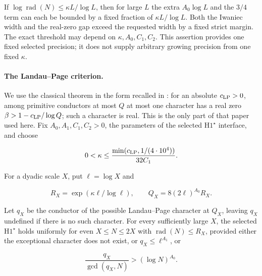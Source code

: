 \documentclass[11pt]{article}
\theoremstyle{definition}
\theoremstyle{remark}
\numberwithin{equation}{section}
\begin{document}
If $\log\operatorname{rad}(N)\le\kappa L/\log L$, then for large $L$ the extra $A_0\log L$ and the $3/4$ term can each be bounded by a fixed fraction of $\kappa L/\log L$. Both the Iwaniec width and the real-zero gap exceed the requested width by a fixed strict margin. The exact threshold may depend on $\kappa,A_0,C_1,C_2$. This assertion provides one fixed selected precision; it does not supply arbitrary growing precision from one fixed $\kappa$.

\paragraph{The Landau--Page criterion.}
We use the classical theorem in the form recalled in
\cite[Lemma~7.1]{FGKMT}: for an absolute $c_{\rm LP}>0$,
among primitive conductors at most $Q$ at most one character
has a real zero $\beta>1-c_{\rm LP}/\log Q$; such a character
is real. This is the only part of that paper used here.
Fix $A_0,A_1,C_1,C_2>0$, the parameters of the selected $\mathrm H1^\star$ interface, and choose


\begin{equation}
0<\kappa\le\frac{\min(c_{\rm LP},1/(4\cdot10^4))}{32C_1}.
\end{equation}


For a dyadic scale $X$, put $\ell=\log X$ and


\begin{equation}
R_X=\exp(\kappa\ell/\log\ell),\qquad Q_X=8(2\ell)^{A_0}R_X.
\end{equation}


Let $q_X$ be the conductor of the possible Landau--Page character at $Q_X$, leaving $q_X$ undefined if there is no such character. For every sufficiently large $X$, the selected $\mathrm H1^\star$ holds uniformly for even $X\le N\le2X$ with $\operatorname{rad}(N)\le R_X$, provided either the exceptional character does not exist, or $q_X\le\ell^{A_1}$, or


\begin{equation}\label{v2:12-3}
\frac{q_X}{\gcd(q_X,N)}>(\log N)^{A_0}.
\end{equation}
\end{document}
